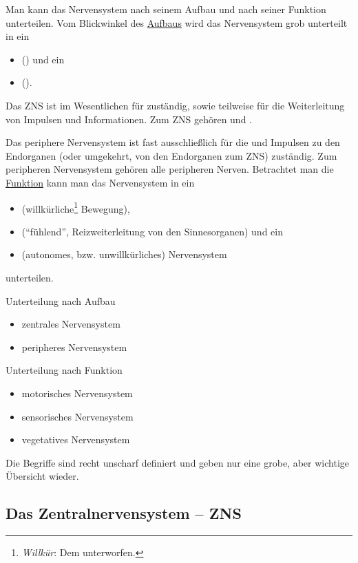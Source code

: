 {%
Man kann das Nervensystem nach seinem Aufbau und nach seiner
Funktion unterteilen.
Vom Blickwinkel des \underline{Aufbaus} wird das Nervensystem grob
unterteilt in ein

\begin{itemize}
\item {} () und ein 
\item {}().
\end{itemize}

\noindent Das ZNS ist im Wesentlichen für  zuständig, sowie teilweise für die
Weiterleitung von Impulsen und Informationen. Zum ZNS
gehören  und .

Das periphere Nervensystem ist fast ausschließlich für die
 und Impulsen zu den
Endorganen (oder umgekehrt, von den Endorganen zum ZNS)
zuständig. Zum peripheren Nervensystem gehören alle peripheren Nerven.
Betrachtet man die \underline{Funktion} kann man das
Nervensystem in ein
\begin{itemize}
  \item {}
  (willkürliche\footnote{\emph{Willkür}: Dem  unterworfen.} Bewegung),
  \item {}
  (\protect\enquote{fühlend}, Reizweiterleitung von den
  Sinnesorganen) und ein
  \item {}
  (autonomes, bzw.
  unwillkürliches) Nervensystem
\end{itemize}
unterteilen. 
}
{
Unterteilung nach Aufbau
\begin{itemize}
  \item zentrales Nervensystem
  \item peripheres Nervensystem
\end{itemize}
Unterteilung nach Funktion
\begin{itemize}
  \item motorisches Nervensystem
  \item sensorisches Nervensystem
  \item vegetatives Nervensystem
\end{itemize}
Die Begriffe sind recht unscharf definiert und geben nur
eine grobe, aber wichtige Übersicht
wieder.
}
{}{}{}

\subsection{Das Zentralnervensystem -- ZNS}
\label{topic:zns}

